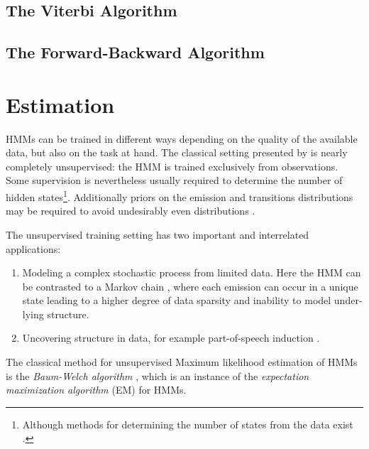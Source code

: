 \subsection{The Viterbi Algorithm}
\label{hmm-viterbi}

\subsection{The Forward-Backward Algorithm}
\label{hmm-fw-bw}

\section{Estimation}

HMMs can be trained in different ways depending on the quality of the
available data, but also on the task at hand. The classical setting
presented by \cite{Rabiner1989} is nearly completely unsupervised: the
HMM is trained exclusively from observations. Some supervision is
nevertheless usually required to determine the number of hidden
states\footnote{Although methods for determining the number of states
  from the data exist \citep{foo}.}. Additionally priors on the
emission and transitions distributions may be required to avoid
undesirably even distributions
\citep{Cutting1992,Johnson2007}.

The unsupervised training setting has two important and
interrelated applications:
\begin{enumerate}
\item Modeling a complex stochastic process from limited data. Here
  the HMM can be contrasted to a Markov chain \citep[318--320]{Manning1999}, where
  each emission can occur in a unique state leading to a higher degree
  of data sparsity and inability to model under-lying structure.
\item Uncovering structure in data, for example part-of-speech
  induction \citep{Johnson2007}.
\end{enumerate}
The classical method for unsupervised Maximum likelihood estimation of
HMMs is the {\it Baum-Welch algorithm} \citep{Rabiner1989}, which is
an instance of the {\it expectation maximization algorithm} (EM)
\citep{Dempster1977} for HMMs.

